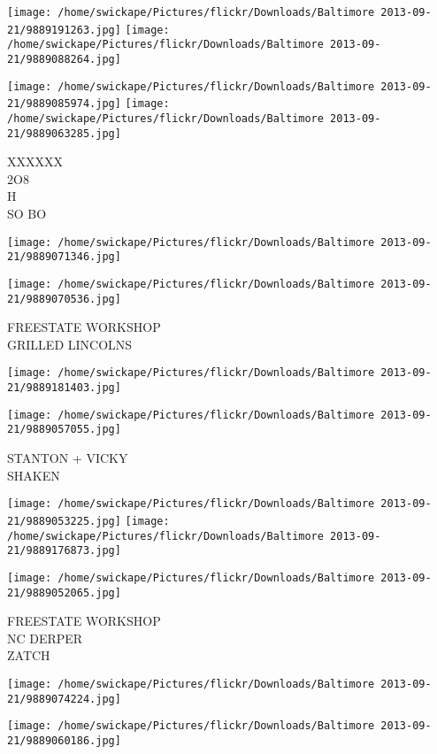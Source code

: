 \documentclass[10pt,letterpaper]{article}
\begin{document}
\texttt{[image: /home/swickape/Pictures/flickr/Downloads/Baltimore 2013-09-21/9889191263.jpg]}
\texttt{[image: /home/swickape/Pictures/flickr/Downloads/Baltimore 2013-09-21/9889088264.jpg]}

\texttt{[image: /home/swickape/Pictures/flickr/Downloads/Baltimore 2013-09-21/9889085974.jpg]}
\texttt{[image: /home/swickape/Pictures/flickr/Downloads/Baltimore 2013-09-21/9889063285.jpg]}

XXXXXX\\
2O8\\
H\\
SO BO
\pagebreak

\texttt{[image: /home/swickape/Pictures/flickr/Downloads/Baltimore 2013-09-21/9889071346.jpg]}

\vspace{0.25in}
\texttt{[image: /home/swickape/Pictures/flickr/Downloads/Baltimore 2013-09-21/9889070536.jpg]}

FREESTATE WORKSHOP\\
GRILLED LINCOLNS
\pagebreak

\texttt{[image: /home/swickape/Pictures/flickr/Downloads/Baltimore 2013-09-21/9889181403.jpg]}

\vspace{0.25in}
\texttt{[image: /home/swickape/Pictures/flickr/Downloads/Baltimore 2013-09-21/9889057055.jpg]}

STANTON + VICKY\\
SHAKEN
\pagebreak

\texttt{[image: /home/swickape/Pictures/flickr/Downloads/Baltimore 2013-09-21/9889053225.jpg]}
\texttt{[image: /home/swickape/Pictures/flickr/Downloads/Baltimore 2013-09-21/9889176873.jpg]}

\texttt{[image: /home/swickape/Pictures/flickr/Downloads/Baltimore 2013-09-21/9889052065.jpg]}

FREESTATE WORKSHOP\\
NC DERPER\\
ZATCH
\pagebreak

\texttt{[image: /home/swickape/Pictures/flickr/Downloads/Baltimore 2013-09-21/9889074224.jpg]}

\vspace{0.25in}
\texttt{[image: /home/swickape/Pictures/flickr/Downloads/Baltimore 2013-09-21/9889060186.jpg]}
\end{document}

